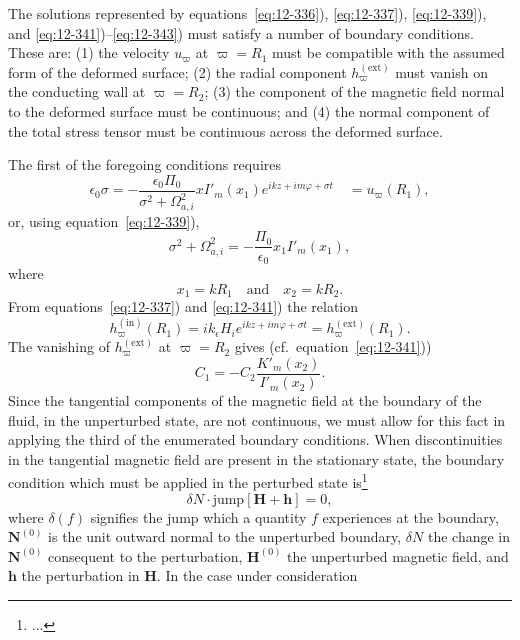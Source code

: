 The solutions represented by equations~\eqref{eq:12-336}), \eqref{eq:12-337}), \eqref{eq:12-339}), and \eqref{eq:12-341})--\eqref{eq:12-343}) must satisfy a number of boundary conditions. These are: (1) the velocity $u_\varpi$ at $\varpi = R_1$ must be compatible with the assumed form of the deformed surface; (2) the radial component $h_\varpi^{(\mathrm{ext})}$ must vanish on the conducting wall at $\varpi = R_2$; (3) the component of the magnetic field normal to the deformed surface must be continuous; and (4) the normal component of the total stress tensor must be continuous across the deformed surface.

The first of the foregoing conditions requires
\begin{equation}
\label{eq:12-344}
\epsilon_0\sigma = -\frac{\epsilon_0\Pi_0}{\sigma^2+\Omega_{a,i}^2}xI'_m(x_1)e^{ikz+im\varphi+\sigma t} \quad = u_\varpi(R_1),
\end{equation}
or, using equation~\eqref{eq:12-339}),
\begin{equation}
\label{eq:12-345}
\sigma^2 + \Omega_{a,i}^2 = -\frac{\Pi_0}{\epsilon_0}x_1 I'_m(x_1),
\end{equation}
where
\begin{equation}
\label{eq:12-346}
x_1 = kR_1 \quad \text{and} \quad x_2 = kR_2.
\end{equation}
From equations~\eqref{eq:12-337}) and \eqref{eq:12-341}) the relation
\begin{equation}
\label{eq:12-347}
h_\varpi^{(\mathrm{in})}(R_1) = ik_\epsilon H_i e^{ikz+im\varphi+\sigma t} = h_\varpi^{(\mathrm{ext})}(R_1).
\end{equation}
The vanishing of $h_\varpi^{(\mathrm{ext})}$ at $\varpi = R_2$ gives (cf.\ equation~\eqref{eq:12-341}))
\begin{equation}
\label{eq:12-348}
C_1 = -C_2 \frac{K'_m(x_2)}{I'_m(x_2)}.
\end{equation}
Since the tangential components of the magnetic field at the boundary of the fluid, in the unperturbed state, are not continuous, we must allow for this fact in applying the third of the enumerated boundary conditions. When discontinuities in the tangential magnetic field are present in the stationary state, the boundary condition which must be applied in the perturbed state is\footnote{...}
\begin{equation}
\label{eq:12-349}
\delta N \cdot \text{jump}[\mathbf{H} + \mathbf{h}] = 0,
\end{equation}
where $\delta(f)$ signifies the jump which a quantity $f$ experiences at the boundary, $\mathbf{N}^{(0)}$ is the unit outward normal to the unperturbed boundary, $\delta N$ the change in $\mathbf{N}^{(0)}$ consequent to the perturbation, $\mathbf{H}^{(0)}$ the unperturbed magnetic field, and $\mathbf{h}$ the perturbation in $\mathbf{H}$. In the case under consideration
